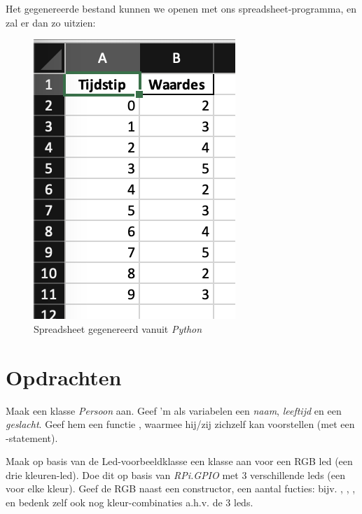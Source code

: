 
Het gegenereerde bestand kunnen we openen met ons spreadsheet-programma, en zal er dan zo uitzien:

\begin{figure}[h!]
\centering\includegraphics[scale=0.7]{Pictures/chapter07/excel2.png}
\caption{Spreadsheet gegenereerd vanuit \textit{Python}}
\label{fig:excel1} %
\end{figure}

\newpage

\section{Opdrachten}
\begin{exercise}
Maak een klasse \textit{Persoon} aan. Geef 'm als variabelen een \textit{naam}, \textit{leeftijd} en een \textit{geslacht}. Geef hem een functie , waarmee hij/zij zichzelf kan voorstellen (met een -statement). 
\end{exercise}

\begin{exercise}
Maak op basis van de Led-voorbeeldklasse een klasse aan voor een RGB led (een drie kleuren-led). Doe dit op basis van \textit{RPi.GPIO} met $3$ verschillende leds (een voor elke kleur). Geef de RGB naast een constructor, een aantal fucties: bijv. , , ,  en bedenk zelf ook nog kleur-combinaties a.h.v. de $3$ leds.
\end{exercise}

